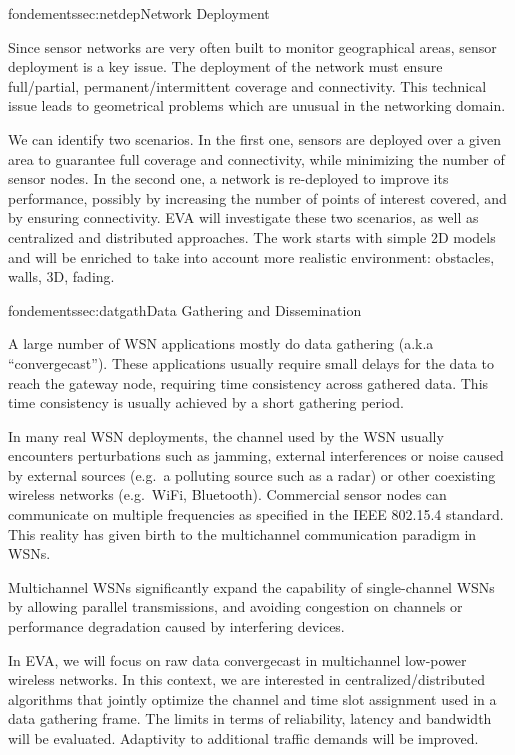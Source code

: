 \documentclass{ra2016}
\begin{document}
\begin{module}{fondements}{sec:netdep}{Network Deployment}

Since sensor networks are very often built to monitor geographical areas, sensor deployment is a key issue.
The deployment of the network must ensure full/partial, permanent/intermittent coverage and connectivity.
This technical issue leads to geometrical problems which are unusual in the networking domain.

We can identify two scenarios.
In the first one, sensors are deployed over a given area to guarantee full coverage and connectivity, while minimizing the number of sensor nodes.
In the second one, a network is re-deployed to improve its performance, possibly by increasing the number of points of interest covered, and by ensuring connectivity.
EVA will investigate these two scenarios, as well as centralized and distributed approaches.
The work starts with simple 2D models and will be enriched to take into account more realistic environment: obstacles, walls, 3D, fading. 

\end{module}

\begin{module}{fondements}{sec:datgath}{Data Gathering and Dissemination}

A large number of WSN applications mostly do data gathering (a.k.a ``convergecast'').
These applications usually require small delays for the data to reach the gateway node, requiring time consistency across gathered data.
This time consistency is usually achieved by a short gathering period.

In many real WSN deployments, the channel used by the WSN usually encounters perturbations such as jamming, external interferences or noise caused by external sources (e.g.~a polluting source such as a radar) or other coexisting wireless networks (e.g.~WiFi, Bluetooth).
Commercial sensor nodes can communicate on multiple frequencies as specified in the IEEE 802.15.4 standard.
This reality has given birth to the multichannel communication paradigm in WSNs.

Multichannel WSNs significantly expand the capability of single-channel WSNs by allowing parallel transmissions, and avoiding congestion on channels or performance degradation caused by interfering devices.

In EVA, we will focus on raw data convergecast in multichannel low-power wireless networks.
In this context, we are interested in centralized/distributed algorithms that jointly optimize the channel and time slot assignment used in a data gathering frame.
The limits in terms of reliability, latency and bandwidth will be evaluated.
Adaptivity to additional traffic demands will be improved. 

\end{module}
\end{document}
